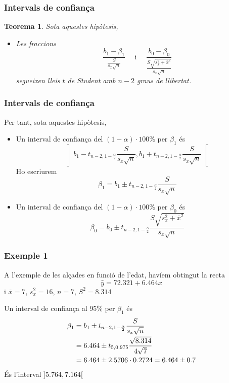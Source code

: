 \documentclass[12pt,t]{beamer}
\theoremstyle{plain}
\newtheorem{teorema}{Teorema}
\theoremstyle{definition}
\begin{document}
\begin{frame}
\frametitle{Intervals de confiança}
\begin{teorema}
Sota aquestes hipòtesis,
\begin{itemize}
\item Les fraccions
$$
\frac{b_1-\beta_1}{\frac{S}{s_x\sqrt{n}}}\quad\mbox{ i }\quad
\frac{b_0-\beta_0}{\frac{S\sqrt{s_x^2+\overline{x}^2}}{s_x\sqrt{n}}}
$$
segueixen lleis $t$ de Student amb $n-2$ graus de llibertat.
\end{itemize}
\end{teorema}

\end{frame}


\begin{frame}
\frametitle{Intervals de confiança}
\vspace*{-2ex}

Per tant, sota aquestes hipòtesis,
\begin{itemize}
\item Un interval de confiança del $(1-\alpha)\cdot 100\%$ per $\beta_1$ és
$$
\left] b_1-t_{n-2,1-\frac{\alpha}{2}} \frac{S}{s_x\sqrt{n}}, b_1+t_{n-2,1-\frac{\alpha}{2}} \frac{S}{s_x\sqrt{n}}\right[
$$
Ho escriurem
$$
\beta_1=b_1\pm t_{n-2,1-\frac{\alpha}{2}} \frac{S}{s_x\sqrt{n}}
$$





\item Un interval de confiança del $(1-\alpha)\cdot 100\%$ per $\beta_0$ és
$$
\beta_0=b_0\pm t_{n-2,1-\frac{\alpha}{2}}\frac{S\sqrt{s_x^2+\overline{x}^2}}{s_x\sqrt{n}}
$$
\end{itemize}

\end{frame}

\begin{frame}
\frametitle{Exemple 1}
\vspace*{-2ex}

A l'exemple de les alçades en funció de l'edat, havíem obtingut la recta
$$
\widehat{y}=72.321+6.464x
$$
i $\overline{x}=7$, $s_x^2=16$, $n=7$, $S^2=8.314$
\medskip

Un interval de confiança al 95\% per $\beta_1$ és
$$
\begin{array}{l}
\displaystyle \beta_1=b_1\pm t_{n-2,1-\frac{\alpha}{2}} \frac{S}{s_x\sqrt{n}}
\\[2ex]
\displaystyle\hphantom{\beta_1} =6.464\pm t_{5,0.975} \frac{\sqrt{8.314}}{4\sqrt{7}}\\[2ex]
\hphantom{\beta_1} =
6.464\pm 2.5706 \cdot 0.2724=6.464\pm  0.7
\end{array}
$$
És l'interval $]5.764,7.164[$
\end{frame}
\end{document}
